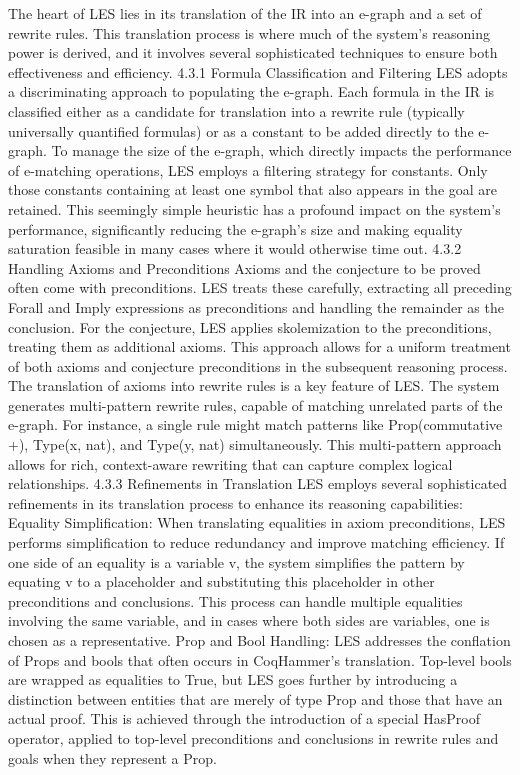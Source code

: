 The heart of LES lies in its translation of the IR into an e-graph and a set of rewrite rules. This translation process is where much of the system's reasoning power is derived, and it involves several sophisticated techniques to ensure both effectiveness and efficiency.
4.3.1 Formula Classification and Filtering
LES adopts a discriminating approach to populating the e-graph. Each formula in the IR is classified either as a candidate for translation into a rewrite rule (typically universally quantified formulas) or as a constant to be added directly to the e-graph.
To manage the size of the e-graph, which directly impacts the performance of e-matching operations, LES employs a filtering strategy for constants. Only those constants containing at least one symbol that also appears in the goal are retained. This seemingly simple heuristic has a profound impact on the system's performance, significantly reducing the e-graph's size and making equality saturation feasible in many cases where it would otherwise time out.
4.3.2 Handling Axioms and Preconditions
Axioms and the conjecture to be proved often come with preconditions. LES treats these carefully, extracting all preceding Forall and Imply expressions as preconditions and handling the remainder as the conclusion.
For the conjecture, LES applies skolemization to the preconditions, treating them as additional axioms. This approach allows for a uniform treatment of both axioms and conjecture preconditions in the subsequent reasoning process.
The translation of axioms into rewrite rules is a key feature of LES. The system generates multi-pattern rewrite rules, capable of matching unrelated parts of the e-graph. For instance, a single rule might match patterns like Prop(commutative +), Type(x, nat), and Type(y, nat) simultaneously. This multi-pattern approach allows for rich, context-aware rewriting that can capture complex logical relationships.
4.3.3 Refinements in Translation
LES employs several sophisticated refinements in its translation process to enhance its reasoning capabilities:
Equality Simplification: When translating equalities in axiom preconditions, LES performs simplification to reduce redundancy and improve matching efficiency. If one side of an equality is a variable v, the system simplifies the pattern by equating v to a placeholder and substituting this placeholder in other preconditions and conclusions. This process can handle multiple equalities involving the same variable, and in cases where both sides are variables, one is chosen as a representative.
Prop and Bool Handling: LES addresses the conflation of Props and bools that often occurs in CoqHammer's translation. Top-level bools are wrapped as equalities to True, but LES goes further by introducing a distinction between entities that are merely of type Prop and those that have an actual proof. This is achieved through the introduction of a special HasProof operator, applied to top-level preconditions and conclusions in rewrite rules and goals when they represent a Prop.
